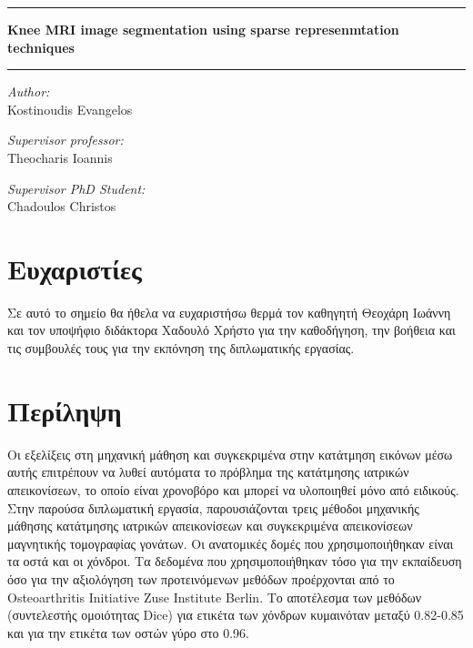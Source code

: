 \documentclass[a4paper,12pt]{article}
\newcommand{\HRule}{\rule{\linewidth}{0.5mm}}
\begin{document}
\begin{titlepage}

\begin{center}
    \HRule
    \vspace{0.4cm}
    { \huge \bfseries Knee MRI image segmentation using sparse represenmtation
                      techniques}
    \vspace{0.4cm}
    \HRule
    \vspace{1.5cm}

    \begin{minipage}{0.8\textwidth}
    \center
    \large
    \emph{Author:} \\ 
    \Large
    Kostinoudis Evangelos
    \end{minipage}
    \vspace{0.5cm}

    \begin{minipage}{0.8\textwidth}
        \center
        \large
        \emph{Supervisor professor:} \\ 
        \Large
        Theocharis Ioannis
    \end{minipage}
    \vspace{0.5cm}

    \begin{minipage}{0.8\textwidth}
        \center
        \large
        \emph{Supervisor PhD Student:} \\ 
        \Large
        Chadoulos Christos
    \end{minipage}
    \vspace{0.5cm}
\end{center}
\end{titlepage}

\section*{Ευχαριστίες}

Σε αυτό το σημείο θα ήθελα να ευχαριστήσω θερμά τον καθηγητή Θεοχάρη Ιωάννη και
τον υποψήφιο διδάκτορα Χαδουλό Χρήστο για την καθοδήγηση, την βοήθεια και τις
συμβουλές τους για την εκπόνηση της διπλωματικής εργασίας.


\section*{Περίληψη}

Οι εξελίξεις στη μηχανική μάθηση και συγκεκριμένα στην κατάτμηση εικόνων
μέσω αυτής επιτρέπουν να λυθεί αυτόματα το πρόβλημα της κατάτμησης ιατρικών
απεικονίσεων, το οποίο είναι χρονοβόρο και μπορεί να υλοποιηθεί μόνο από
ειδικούς. Στην παρούσα διπλωματική εργασία, παρουσιάζονται τρεις μέθοδοι
μηχανικής μάθησης κατάτμησης ιατρικών απεικονίσεων και συγκεκριμένα απεικονίσεων
μαγνητικής τομογραφίας γονάτων. Οι ανατομικές δομές που χρησιμοποιήθηκαν είναι
τα οστά και οι χόνδροι. Τα δεδομένα που χρησιμοποιήθηκαν τόσο για την εκπαίδευση
όσο για την αξιολόγηση των προτεινόμενων μεθόδων προέρχονται από το
Osteoarthritis Initiative Zuse Institute Berlin. Το αποτέλεσμα των μεθόδων
(συντελεστής ομοιότητας Dice) για ετικέτα των χόνδρων κυμαινόταν μεταξύ
0.82-0.85 και για την ετικέτα των οστών γύρο στο 0.96. 
\end{document}
